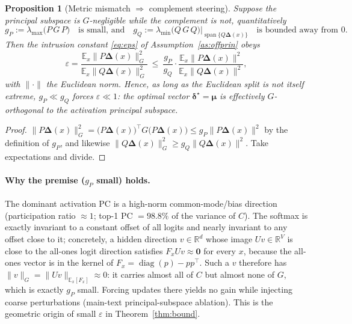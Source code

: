 \documentclass[11pt]{article}
\newtheorem{proposition}{Proposition}[section]
\DeclareMathOperator{\diag}{diag}
\newcommand{\R}{\mathbb{R}}
\newcommand{\E}{\mathbb{E}}
\newcommand{\bdelta}{\bm{\delta}}
\newcommand{\bDelta}{\bm{\Delta}}
\newcommand{\bmu}{\bm{\mu}}
\newcommand{\Gnorm}[1]{\lVert #1\rVert_G}
\begin{document}
\begin{proposition}[Metric mismatch $\Rightarrow$ complement steering]\label{prop:mismatch}
Suppose the principal subspace is $G$-negligible while the complement is not, quantitatively
\begin{equation*}
g_P:=\lambda_{\max}\big(P\,G\,P\big)
\quad\text{is small, and}\quad
g_Q:=\lambda_{\min}\big(Q\,G\,Q\big)\big|_{\operatorname{span}\{Q\bDelta(x)\}}
\quad\text{is bounded away from }0 .
\end{equation*}
Then the intrusion constant \eqref{eq:eps} of Assumption~\ref{as:offprin} obeys
\begin{equation*}
\varepsilon
=\frac{\E_x\Gnorm{P\bDelta(x)}^2}{\E_x\Gnorm{Q\bDelta(x)}^2}
\ \le\ \frac{g_P}{g_Q}\cdot
\frac{\E_x\|P\bDelta(x)\|^2}{\E_x\|Q\bDelta(x)\|^2},
\end{equation*}
with $\|\cdot\|$ the Euclidean norm. Hence, as long as the Euclidean split is not itself extreme,
$g_P\ll g_Q$ forces $\varepsilon\ll1$: the optimal vector $\bdelta^\star=\bmu$ is effectively
$G$-orthogonal to the activation principal subspace.
\end{proposition}
\begin{proof}
$\Gnorm{P\bDelta(x)}^2=\big(P\bDelta(x)\big)^\top G\big(P\bDelta(x)\big)\le g_P\|P\bDelta(x)\|^2$ by
the definition of $g_P$, and likewise $\Gnorm{Q\bDelta(x)}^2\ge g_Q\|Q\bDelta(x)\|^2$. Take
expectations and divide.
\end{proof}

\paragraph{Why the premise ($g_P$ small) holds.}
The dominant activation PC is a high-norm common-mode/bias direction (participation ratio
$\approx1$; top-1 PC $=98.8\%$ of the variance of $C$). The softmax is exactly invariant to a
constant offset of all logits and nearly invariant to any offset close to it; concretely, a hidden
direction $v\in\R^d$ whose image $Uv\in\R^V$ is close to the all-ones logit direction satisfies
$F_xUv\approx\mathbf 0$ for every $x$, because the all-ones vector is in the kernel of
$F_x=\diag(p)-pp^\top$. Such a $v$ therefore has $\Gnorm{v}=\|U v\|_{\E_x[F_x]}\approx0$: it carries
almost all of $C$ but almost none of $G$, which is exactly $g_P$ small. Forcing updates there yields
no gain while injecting coarse perturbations (main-text principal-subspace ablation). This is the
geometric origin of small $\varepsilon$ in Theorem~\ref{thm:bound}.
\end{document}
